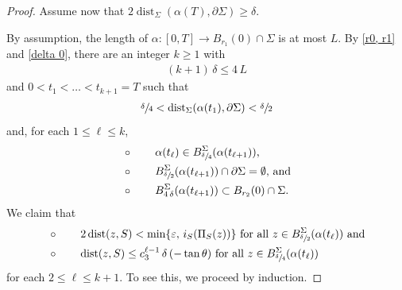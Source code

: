 \documentclass[11pt]{amsart}
\begin{document}
\begin{proof}
		
		
		Assume now that $2\operatorname{dist}_\Sigma(\alpha(T),\partial \Sigma)\geq \delta$.
		

By assumption,  the length of $\alpha:[0,T]\to B_{r_1}(0)\cap \Sigma$ is at most $L$. By \eqref{r0, r1} and \eqref{delta 0}, there are an integer $k\geq 1$ with 
		\begin{align} \label{k bound 0}
			(k+1)\,\delta\leq  4\,L
		\end{align}
		and  $0<t_1<\ldots <t_{k+1}=T$ such that 
		\begin{align} \label{p -1}
		\sfrac\delta4<	\operatorname{dist}_\Sigma(\alpha(t_1), \partial \Sigma)<\sfrac\delta2 		
		\end{align} 
	 and, for each $1\leq \ell \leq k$, 
		\begin{align}
			&\circ\qquad  \text{$\alpha(t_{\ell})\in B^\Sigma_{\sfrac{\delta}{4}}(\alpha(t_{\ell+1}))$,} \label{connect 0} \\
			&\circ \qquad \text{$B^\Sigma_{\sfrac{\delta}{2}}{(\alpha(t_{\ell+1}))}\cap \partial \Sigma=\emptyset$, and} \label{sufficiently large ball 1 0}	  \\
			&\circ \qquad \text{$B^\Sigma_{4\,\delta}{(\alpha(t_{\ell+1}))}\subset B_{r_2}(0)\cap\Sigma$.}	\label{sufficiently large ball 2 0}	 		
		\end{align}
		We claim that 
		\begin{align}
			&\circ \qquad \text{$2\operatorname{dist}(z,S)<\min\{\varepsilon,\,i_S(\Pi_S(z))\}$ for all  $z\in B^\Sigma_{\sfrac{\delta}{2}}(\alpha(t_\ell))$ and} \label{to show 1 0}\\
			&\circ\qquad  
			\operatorname{dist}(z,S)\leq c_3^{\ell-1}\,\delta\,(-\tan\theta)  \text{ for all  $z\in B^\Sigma_{\sfrac{\delta}{4}}{(\alpha(t_\ell))}$} \label{to show 2 0} 
		\end{align}			
		for each $2\leq \ell \leq k+1$.
		To see this, we proceed by induction. 
		

\end{proof}
\end{document}
